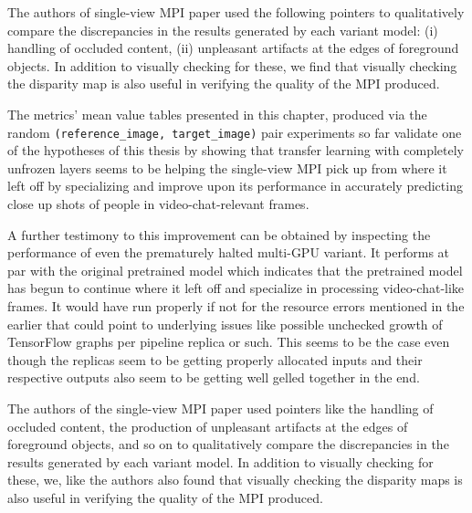 The authors of single-view MPI paper used the following pointers to qualitatively compare the discrepancies in the results generated by each variant model: (i) handling of occluded content, (ii) unpleasant artifacts at the edges of foreground objects. In addition to visually checking for these, we find that visually checking the disparity map is also useful in verifying the quality of the MPI produced.  

The metrics' mean value tables presented in this chapter, produced via the random \texttt{(reference\_image, target\_image)} pair experiments so far validate one of the hypotheses of this thesis by showing that transfer learning with completely unfrozen layers seems to be helping the single-view MPI pick up from where it left off by specializing and improve upon its performance in accurately predicting close up shots of people in video-chat-relevant frames. 

A further testimony to this improvement can be obtained by inspecting the performance of even the prematurely halted multi-GPU variant. It performs at par with the original pretrained model which indicates that the pretrained model has begun to continue where it left off and specialize in processing video-chat-like frames. It would have run properly if not for the resource errors mentioned in the earlier that could point to underlying issues like possible unchecked growth of TensorFlow graphs per pipeline replica or such. This seems to be the case even though the replicas seem to be getting properly allocated inputs and their respective outputs also seem to be getting well gelled together in the end.

The authors of the single-view MPI paper used pointers like the handling of occluded content, the production of unpleasant artifacts at the edges of foreground objects, and so on to qualitatively compare the discrepancies in the results generated by each variant model. In addition to visually checking for these, we, like the authors also found that visually checking the disparity maps is also useful in verifying the quality of the MPI produced.




